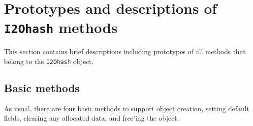 \par
\section{Prototypes and descriptions of {\tt I2Ohash} methods}
\label{section:I2Ohash:proto}
\par
This section contains brief descriptions including prototypes
of all methods that belong to the {\tt I2Ohash} object.
\par
\subsection{Basic methods}
\label{subsection:I2Ohash:proto:basics}
\par
As usual, there are four basic methods to support object creation,
setting default fields, clearing any allocated data, and free'ing
the object.
\par

